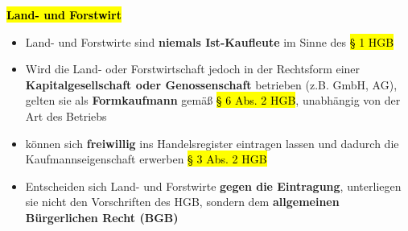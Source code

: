 \documentclass[a4paper, 10pt]{article}
\begin{document}
\textbf{\hl{Land- und Forstwirt}}
\begin{itemize}
    \item Land- und Forstwirte sind \textbf{niemals Ist-Kaufleute} im Sinne des \hl{§ 1 HGB}
    \item Wird die Land- oder Forstwirtschaft jedoch in der Rechtsform einer \textbf{Kapitalgesellschaft oder Genossenschaft} betrieben (z.B. GmbH, AG), gelten sie als \textbf{Formkaufmann} gemäß \hl{§ 6 Abs. 2 HGB}, unabhängig von der Art des Betriebs
    \item können sich \textbf{freiwillig} ins Handelsregister eintragen lassen und dadurch die Kaufmannseigenschaft erwerben \hl{§ 3 Abs. 2 HGB}
    \item Entscheiden sich Land- und Forstwirte \textbf{gegen die Eintragung}, unterliegen sie nicht den Vorschriften des HGB, sondern dem \textbf{allgemeinen Bürgerlichen Recht (BGB)}
\end{itemize}
\end{document}
